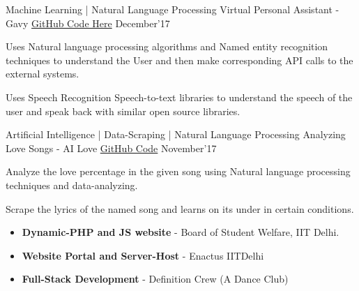 
\begin{cventries}

  \cventry
    {Machine Learning |  Natural Language Processing} %
    {Virtual Personal Assistant - Gavy} %
    {\href{https://github.com/Gavy-VA}{GitHub Code Here}} %
    {December’17} %
    {
      \begin{cvitems} %
        \item {Uses Natural language processing algorithms and Named entity recognition techniques to understand the User and then make corresponding API calls to the external systems.}
        \item {Uses Speech Recognition Speech-to-text libraries to understand the speech of the user and speak back with similar open source libraries.}
      \end{cvitems}
    }

  \cventry
    {Artificial Intelligence | Data-Scraping |  Natural Language Processing} %
    {Analyzing Love Songs - AI Love} %
    {\href{https://github.com/techcentaur/AI-Love-Detection}{GitHub Code}} %
    {November’17} %
    {
      \begin{cvitems} %
        \item {Analyze the love percentage in the given song using Natural language processing techniques and data-analyzing.}
        \item {Scrape the lyrics of the named song and learns on its under in certain conditions.}
      \end{cvitems}
    }
\end{cventries}


\begin{cvparagraph}
\begin{itemize}
  \item \textbf{Dynamic-PHP and JS website} - Board of Student Welfare, IIT Delhi.
  \item \textbf{Website Portal and Server-Host} - Enactus IITDelhi
  \item\textbf{Full-Stack Development} - Definition Crew (A Dance Club)
\end{itemize}
\end{cvparagraph}
